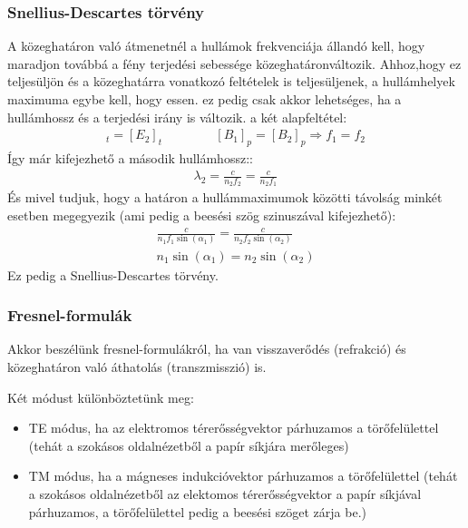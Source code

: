 \documentclass{article}
\begin{document}
\subsubsection{Snellius-Descartes törvény}
A közeghatáron való átmenetnél a hullámok frekvenciája állandó kell, hogy maradjon továbbá a fény terjedési sebessége közeghatáronváltozik. Ahhoz,hogy ez teljesüljön és a közeghatárra vonatkozó feltételek is teljesüljenek, a hullámhelyek maximuma egybe kell, hogy essen. ez pedig csak akkor lehetséges, ha a hullámhossz és a terjedési irány is változik. a két alapfeltétel:
\begin{gather*}
[E_1]_t = [E_2]_t \hspace{50pt} [B_1]_p = [B_2]_p \Rightarrow f_1 = f_2
\end{gather*}
Így már kifejezhető a második hullámhossz::
\begin{gather*}
\lambda_2 = \frac{c}{n_2 f_2} = \frac{c}{n_2 f_1}
\end{gather*}
És mivel tudjuk, hogy a határon a hullámmaximumok közötti távolság minkét esetben megegyezik (ami pedig a beesési szög szinuszával kifejezhető):
\begin{gather*}
\frac{c}{n_1f_1\sin(\alpha_1)} = \frac{c}{n_2f_2\sin(\alpha_2)} \\
n_1 \sin(\alpha_1) = n_2 \sin(\alpha_2)
\end{gather*}
Ez pedig a Snellius-Descartes törvény. 
\subsubsection{Fresnel-formulák}
Akkor beszélünk fresnel-formulákról, ha van visszaverődés (refrakció) és közeghatáron való áthatolás (transzmisszió) is.


Két módust különböztetünk meg: 
\begin{itemize}
\item TE módus, ha az elektromos térerősségvektor párhuzamos a törőfelülettel (tehát a szokásos oldalnézetből a papír síkjára merőleges)
\item TM módus, ha a mágneses indukcióvektor párhuzamos a törőfelülettel (tehát a szokásos oldalnézetből az elektomos térerősségvektor a papír síkjával párhuzamos, a törőfelülettel pedig a beesési szöget zárja be.) 
\end{itemize}
\end{document}
